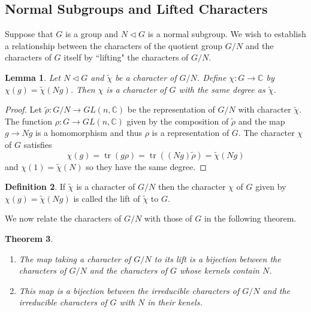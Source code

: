 \documentclass[11pt, notitlepage]{article}
\numberwithin{equation}{section}
\theoremstyle{plain}
\newtheorem{theorem}{Theorem}[section]
\newtheorem{lemma}[theorem]{Lemma}
\theoremstyle{definition}
\newtheorem{definition}[theorem]{Definition}
\DeclareMathOperator{\tr}{tr}
\begin{document}
\subsection{Normal Subgroups and Lifted Characters}
Suppose that $G$ is a group and $N\triangleleft G$ is a normal subgroup. We wish to establish a relationship between the characters of the quotient group $G/N$ and the characters of $G$ itself by ``lifting" the characters of $G/N$.

\begin{lemma}
Let $N\triangleleft G$ and $\tilde{\chi}$ be a character of $G/N$. Define $\chi:G\to\mathbb{C}$ by $\chi(g) = \tilde{\chi}(Ng)$. Then $\chi$ is a character of $G$ with the same degree as $\tilde{\chi}$.
\end{lemma}
\begin{proof}
Let $\tilde\rho: G/N \to GL(n, \mathbb{C})$ be the representation of $G/N$ with character $\tilde\chi$. The function $\rho:G\to GL(n,\mathbb{C})$ given by the composition of $\tilde\rho$ and the map $g\to Ng$ is a homomorphism and thus $\rho$ is a representation of $G$. The character $\chi$ of $G$ satisfies
\[
	\chi(g) = \tr(g\rho) = \tr((Ng)\tilde\rho) = \tilde\chi(Ng) 
\]
and $\chi(1) = \tilde\chi(N)$ so they have the same degree.
\end{proof}

\begin{definition}
If $\tilde\chi$ is a character of $G/N$ then the character $\chi$ of $G$ given by $\chi(g) = \tilde\chi(Ng)$ is called the lift of $\tilde\chi$ to $G$.
\end{definition}

We now relate the characters of $G/N$ with those of $G$ in the following theorem.

\begin{theorem} ~
\begin{enumerate}[label=\emph{(\Roman*)}]
	\item The map taking a character of $G/N$ to its lift is a bijection between the characters of $G/N$ and the characters of $G$ whose kernels contain $N$.
	\item	This map is a bijection between the irreducible characters of $G/N$ and the irreducible characters of $G$ with $N$ in their kenels.
\end{enumerate} 

\end{theorem}
\end{document}

